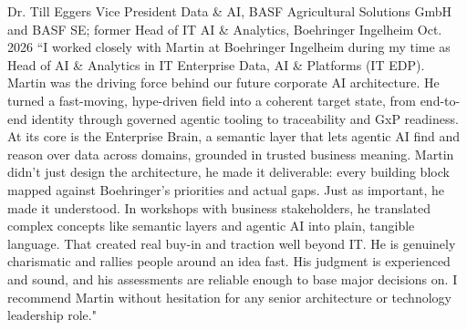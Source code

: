 
\begin{cventries}

  \cvrecommendation
    {Dr. Till Eggers}
    {Vice President Data \& AI, BASF Agricultural Solutions GmbH and BASF SE; former Head of IT AI \& Analytics, Boehringer Ingelheim}
    {Oct. 2026}
    {
      ``I worked closely with Martin at Boehringer Ingelheim during my time as Head of AI \& Analytics in IT Enterprise Data, AI \& Platforms (IT EDP). Martin was the driving force behind our future corporate AI architecture. He turned a fast-moving, hype-driven field into a coherent target state, from end-to-end identity through governed agentic tooling to traceability and GxP readiness. At its core is the Enterprise Brain, a semantic layer that lets agentic AI find and reason over data across domains, grounded in trusted business meaning. Martin didn't just design the architecture, he made it deliverable: every building block mapped against Boehringer's priorities and actual gaps. Just as important, he made it understood. In workshops with business stakeholders, he translated complex concepts like semantic layers and agentic AI into plain, tangible language. That created real buy-in and traction well beyond IT. He is genuinely charismatic and rallies people around an idea fast. His judgment is experienced and sound, and his assessments are reliable enough to base major decisions on. I recommend Martin without hesitation for any senior architecture or technology leadership role."
    }

    \vspace{1.0mm}


\end{cventries}
